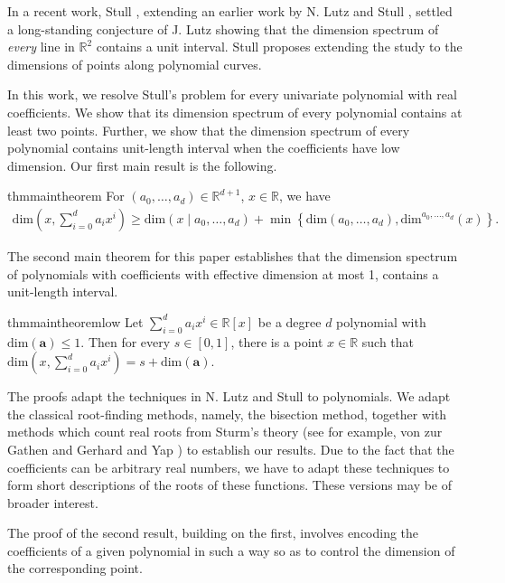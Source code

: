 \documentclass[a4paper,UKenglish,cleveref,autoref,thm-restate]{lipics-v2021}
\newcommand{\R}{\mathbb{R}}
\renewcommand{\dim}{{\mathrm{dim}}}
\begin{document}
In a recent work, Stull \cite{Stull2022}, extending an earlier work by N. Lutz and Stull \cite{Lutz2020e}, settled a long-standing conjecture of J. Lutz showing that the dimension spectrum of \emph{every} line in $\R^2$ contains a unit interval. Stull \cite{Stull2022} proposes extending the study to the dimensions of points along polynomial curves. 

In this work, we resolve Stull's problem for every univariate
polynomial with real coefficients. We show that its dimension spectrum of every polynomial contains at least two points. Further, we show that the dimension spectrum of every polynomial contains unit-length interval when the coefficients have low dimension. Our first main result is the following.
\begin{restatable}[]{thm}{maintheorem}\label{thm:d_degree_bound}
  For $(a_0,\dots,a_d)\in\R^{d+1}$, $x\in\R$, we have
  \begin{align}
    \label{ineq:degree_d}
    \dim\left(x,\sum_{i=0}^d a_i x^i\right)
    \ge
    \dim\left(x\mid a_0,\dots,a_d\right)+
    \min\left\{\dim\left(a_0,\dots,a_d\right),\dim^{a_0,\dots,a_d}(x)\right\}.
  \end{align}
\end{restatable}
The second main theorem for this paper establishes that the dimension spectrum of polynomials with coefficients with effective dimension at most 1, contains a unit-length interval. 
\begin{restatable}[]{thm}{maintheoremlow}\label{thm:less}
  Let $\sum_{i=0}^{d}a_ix^i\in\mathbb{R}[x]$ be a degree $d$
  polynomial with $\dim(\mathbf{a})\leq1$. Then for every $s\in[0,1]$,
  there is a point $x\in\mathbb{R}$ such that
  $\dim\left(x,\sum_{i=0}^{d}a_ix^i\right)=s+\dim(\mathbf{a})$.
\end{restatable}
The proofs adapt the techniques in N. Lutz and Stull \cite{Lutz2020e} to polynomials. We adapt the classical root-finding methods, namely, the bisection method, together with methods which count real roots from Sturm's theory \cite{Sturm1835} (see for example, von zur Gathen and Gerhard \cite{Gathen2013} and Yap \cite{Yap2000}) to establish our results. Due to the fact that the coefficients can be arbitrary real numbers, we have to adapt these techniques to form short descriptions of the roots of these functions. These versions may be of broader interest. 

The proof of the second result, building on the first, involves
encoding the coefficients of a given polynomial in such a way so as to control the dimension of the corresponding point. 
\end{document}
